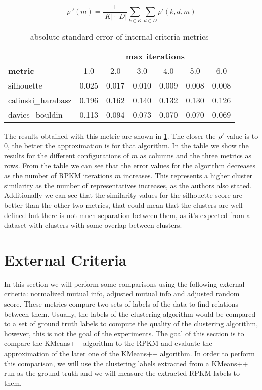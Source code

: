 $$\bar\rho\ '(m) = \frac{1}{|K| \cdot |D|}\sum_{k \in K}\sum_{d \in D} \rho'(k,d,m)$$

\begin{table}[ht!]
    \centering
    \begin{tabular}{l|cccccc|}
    \cline{2-7}
                                             & \multicolumn{6}{c|}{\textbf{max iterations}}  \\ \cline{1-1}
    \multicolumn{1}{|l|}{\textbf{metric}}    & 1.0   & 2.0   & 3.0   & 4.0   & 5.0   & 6.0   \\ \hline
    \multicolumn{1}{|l|}{silhouette}         & 0.025 & 0.017 & 0.010 & 0.009 & 0.008 & 0.008 \\
    \multicolumn{1}{|l|}{calinski\_harabasz} & 0.196 & 0.162 & 0.140 & 0.132 & 0.130 & 0.126 \\
    \multicolumn{1}{|l|}{davies\_bouldin}    & 0.113 & 0.094 & 0.073 & 0.070 & 0.070 & 0.069 \\ \hline
    \end{tabular}
    \caption{absolute standard error of internal criteria metrics}
    \label{table:metrics_std_error}
\end{table}

The results obtained with this metric are shown in \ref{table:metrics_std_error}. The closer the $\rho'$ value is to 0, the better the approximation is for that algorithm. In the table we show the results for the different configurations of $m$ as columns and the three metrics as rows. From the table we can see that the error values for the algorithm decreases as the number of RPKM iterations $m$ increases. This represents a higher cluster similarity as the number of representatives increases, as the authors also stated. Additionally we can see that the similarity values for the silhouette score are better than the other two metrics, that could mean that the clusters are well defined but there is not much separation between them, as it's expected from a dataset with clusters with some overlap between clusters.

\section{External Criteria}

In this section we will perform some comparisons using the following external criteria: normalized mutual info, adjusted mutual info and adjusted random score. These metrics compare two sets of labels of the data to find relations between them. Usually, the labels of the clustering algorithm would be compared to a set of ground truth labels to compute the quality of the clustering algorithm, however, this is not the goal of the experiments. The goal of this section is to compare the KMeans++ algorithm to the RPKM and evaluate the approximation of the later one of the KMeans++ algorithm. In order to perform this comparison, we will use the clustering labels extracted from a KMeans++ run as the ground truth and we will measure the extracted RPKM labels to them.


